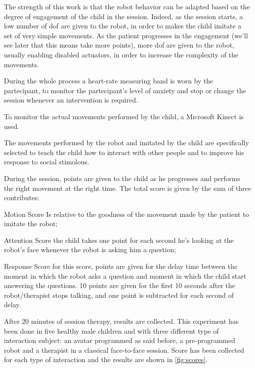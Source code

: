 \documentclass[12pt,journal,draftclsnofoot,onecolumn]{IEEEtran}
\begin{document}
The strength of this work is that the robot behavior can be adapted based on the degree of engagement of the child in the session.
Indeed, as the session starts, a low number of \gls{dof} are given to the robot, in order to makes the child imitate a set of very simple movements.
As the patient progresses in the engagement (we'll see later that this means take more points), more \gls{dof} are given to the robot, usually enabling disabled actuators, in order to increase the complexity of the movements.

During the whole process a heart-rate measuring band is worn by the partecipant, to monitor the partecipant's level of anxiety and stop or change the session whenever an intervention is required.

To monitor the actual movements performed by the child, a Microsoft Kinect is used.

The movements performed by the robot and imitated by the child are specifically selected to teach the child how to interact with other people and to improve his response to social stimolous.

During the session, points are given to the child as he progresses and performs the right movement at the right time.
The total score is given by the sum of three contributes:

\begin{LaTeXdescription}
	\item[Motion Score] Is relative to the goodness of the movement made by the patient to imitate the robot;
	\item[Attention Score] the child takes one point for each second he's looking at the robot’s face whenever the robot is asking him a question;
	\item[Response Score] for this score, points are given for the delay time between the moment in which the robot asks a question and moment in which the child start answering the questions.
	10 points are given for the first 10 seconds after the robot/therapist stops talking, and one point is subtracted for each second of delay.
\end{LaTeXdescription}

After 20 minutes of session therapy, results are collected.
This experiment has been done in five healthy male children and with three different type of interaction subject: an avatar programmed as said before, a pre-programmed robot and a therapist in a classical face-to-face session. Score has been collected for each type of interaction and the results are shown in \autoref{fig:scores}.
\end{document}
